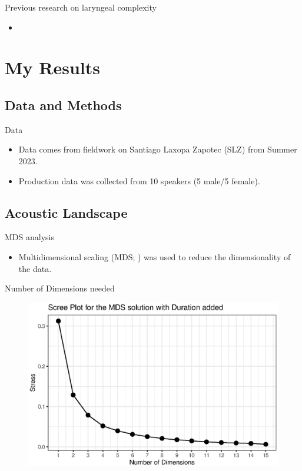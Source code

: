 \documentclass[professionalfont]{beamer}
\begin{document}
\begin{frame}{Previous research on laryngeal complexity}
  \begin{itemize}
    \item 
  \end{itemize}
\end{frame}

\section{My Results}
\subsection{Data and Methods}
\begin{frame}{Data}
  \begin{itemize}
    \item Data comes from fieldwork on Santiago Laxopa Zapotec (SLZ) from Summer 2023.
    \item Production data was collected from 10 speakers (5 male/5 female).
  \end{itemize}
\end{frame}

\subsection{Acoustic Landscape}

\begin{frame}{MDS analysis}
  \begin{itemize}
    \item Multidimensional scaling (MDS; \cite{kruskalMultidimensionalScaling1978}) was used to reduce the dimensionality of the data.

  \end{itemize}
\end{frame}

\begin{frame}{Number of Dimensions needed}
  \begin{figure}[h!]
    \centering
    \includegraphics[width = 0.8\linewidth]{images/MDS/stress_plot_dur.eps}
\end{figure}
\end{frame}
\end{document}
